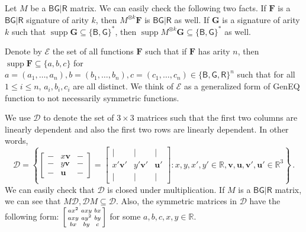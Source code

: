 \documentclass[11pt]{article}
\DeclareMathOperator{\supp}{supp}
\newcommand{\db}{\mathsf{B}}
\newcommand{\dg}{\mathsf{G}}
\newcommand{\dr}{\mathsf{R}}
\newcommand{\geneq}{\textsf{GenEQ}\xspace}
\begin{document}
Let $M$ be a $\db \dg | \dr$ matrix.
We can easily check the following two facts.
If $\mathbf{F}$ is a $\db \dg | \dr$ signature of arity $k$, then $M^{\otimes k} \mathbf{F}$ is $\db \dg | \dr$ as well.
If $\mathbf{G}$ is a signature of arity $k$ such that $\supp \mathbf{G} \subseteq \{\db, \dg\}^*$, then $\supp M^{\otimes k} \mathbf{G} \subseteq \{\db, \dg\}^*$ as well.



Denote by $\mathcal{E}$  the set of all functions $\mathbf{F}$ such that if $\mathbf{F}$ has arity $n$, then $\supp \mathbf{F} \subseteq \{a, b, c\}$ for $a = (a_1, \ldots, a_n), b = (b_1, \ldots, b_n), c = (c_1, \ldots, c_n) \in \{\db, \dg, \dr\}^n$ such that for all $1 \le i \le n$, $a_i, b_i, c_i$ are all distinct.
We think of $\mathcal{E}$ as a generalized form of \geneq function to not necessarily symmetric functions.

We use $\mathcal{D}$ to denote the set of $3 \times 3$ matrices such that the first two columns are linearly dependent and also the first two rows are linearly dependent.
In other words,
\[
  \mathcal{D} = \left\{ \begin{bmatrix}
      - & x \mathbf{v} & - \\
      - & y \mathbf{v} & - \\
      - & \mathbf{u} & -
      \end{bmatrix} = \begin{bmatrix}
      \vert & \vert & \vert \\
      x' \mathbf{v}' & y' \mathbf{v}' & \mathbf{u}' \\
      \vert & \vert & \vert
  \end{bmatrix} : x, y, x', y' \in \mathbb{R}, \mathbf{v}, \mathbf{u}, \mathbf{v}', \mathbf{u}' \in \mathbb{R}^3 \right\}
  \,.
\]
We can easily check that $\mathcal{D}$ is closed under multiplication.
If $M$ is a $\db \dg | \dr$ matrix, we can see that $M \mathcal{D}, \mathcal{D} M \subseteq \mathcal{D}$.
Also, the symmetric matrices in $\mathcal{D}$ have the following form:
$\begin{bsmallmatrix}
  a x^2 & a xy & bx \\
  axy & ay^2 & by \\
  bx & by & c
\end{bsmallmatrix}$ 
for some $a, b, c, x, y \in \mathbb{R}$.
\end{document}
